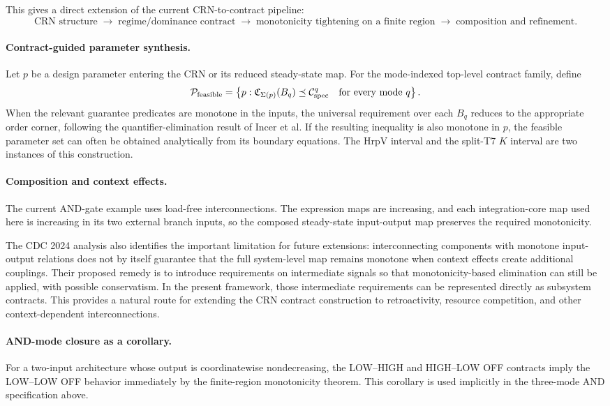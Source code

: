 This gives a direct extension of the current CRN-to-contract pipeline:
\[
\text{CRN structure}
\;\longrightarrow\;
\text{regime/dominance contract}
\;\longrightarrow\;
\text{monotonicity tightening on a finite region}
\;\longrightarrow\;
\text{composition and refinement}.
\]

\paragraph{Contract-guided parameter synthesis.}
Let $p$ be a design parameter entering the CRN or its reduced steady-state
map. For the mode-indexed top-level contract family, define
\[
\mathcal P_{\rm feasible}
=
\left\{
p:
\mathfrak C_{\Sigma(p)}(B_q)
\preceq
\mathcal C_{\rm spec}^q
\quad\text{for every mode }q
\right\}.
\]
When the relevant guarantee predicates are monotone in the inputs, the
universal requirement over each $B_q$ reduces to the appropriate order corner,
following the quantifier-elimination result of Incer et al. If the resulting
inequality is also monotone in $p$, the feasible parameter set can often be
obtained analytically from its boundary equations. The HrpV interval and the
split-T7 $K$ interval are two instances of this construction.

\paragraph{Composition and context effects.}
The current AND-gate example uses load-free interconnections. The expression
maps are increasing, and each integration-core map used here is increasing in
its two external branch inputs, so the composed steady-state input-output map
preserves the required monotonicity.

The CDC 2024 analysis also identifies the important limitation for future
extensions: interconnecting components with monotone input-output relations
does not by itself guarantee that the full system-level map remains monotone
when context effects create additional couplings. Their proposed remedy is to
introduce requirements on intermediate signals so that monotonicity-based
elimination can still be applied, with possible conservatism. In the present
framework, those intermediate requirements can be represented directly as
subsystem contracts. This provides a natural route for extending the CRN
contract construction to retroactivity, resource competition, and other
context-dependent interconnections.

\paragraph{AND-mode closure as a corollary.}
For a two-input architecture whose output is coordinatewise nondecreasing, the
LOW--HIGH and HIGH--LOW OFF contracts imply the LOW--LOW OFF behavior
immediately by the finite-region monotonicity theorem. This corollary is used
implicitly in the three-mode AND specification above.
